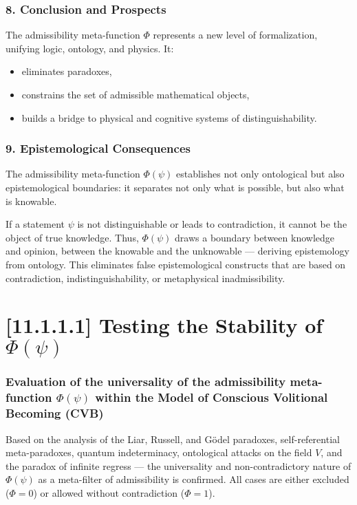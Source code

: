 \documentclass[12pt]{article}
\begin{document}
\subsubsection*{8. Conclusion and Prospects}

The admissibility meta-function $\Phi$ represents a new level of formalization, unifying logic, ontology, and physics. It:

\begin{itemize}
\item eliminates paradoxes,
\item constrains the set of admissible mathematical objects,
\item builds a bridge to physical and cognitive systems of distinguishability.
\end{itemize}

\subsubsection*{9. Epistemological Consequences}

The admissibility meta-function $\Phi(\psi)$ establishes not only ontological but also epistemological boundaries: it separates not only what is possible, but also what is knowable.

If a statement $\psi$ is not distinguishable or leads to contradiction, it cannot be the object of true knowledge. Thus, $\Phi(\psi)$ draws a boundary between knowledge and opinion, between the knowable and the unknowable — deriving epistemology from ontology. This eliminates false epistemological constructs that are based on contradiction, indistinguishability, or metaphysical inadmissibility.

\section*{[11.1.1.1] Testing the Stability of $\Phi(\psi)$}

\subsubsection*{Evaluation of the universality of the admissibility meta-function $\Phi(\psi)$ within the Model of Conscious Volitional Becoming (CVB)}

Based on the analysis of the Liar, Russell, and Gödel paradoxes, self-referential meta-paradoxes, quantum indeterminacy, ontological attacks on the field $V$, and the paradox of infinite regress — the universality and non-contradictory nature of $\Phi(\psi)$ as a meta-filter of admissibility is confirmed. All cases are either excluded ($\Phi = 0$) or allowed without contradiction ($\Phi = 1$).
\end{document}
